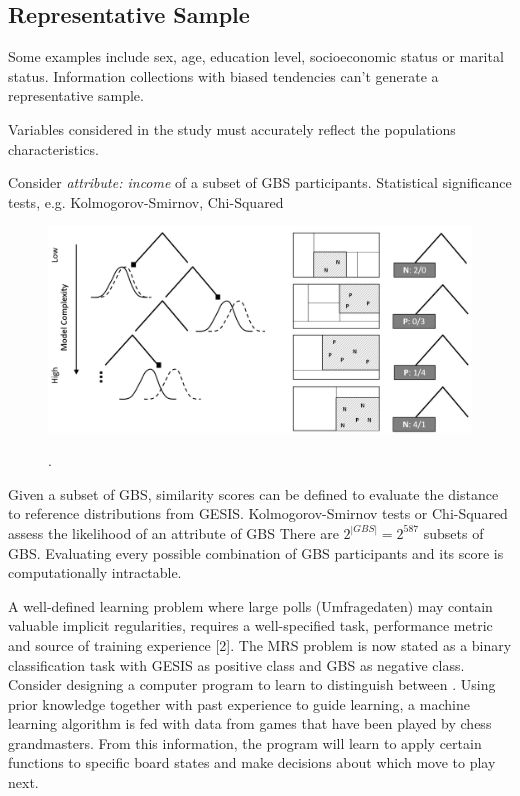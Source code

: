 \subsection{Representative Sample}

Some examples include sex, age, education level, socioeconomic status or marital status. Information collections with biased tendencies can't generate a representative sample.

Variables considered in the study must accurately reflect the populations characteristics. 

Consider \textit{attribute: income} of a subset of GBS participants. Statistical significance tests, e.g. Kolmogorov-Smirnov, Chi-Squared

\begin{figure}[ht]
	\begin{center}
		\includegraphics[scale=0.40,angle=0]{fig/tree3}
		\label{project}
		\caption{.}
	\end{center}
\end{figure}

Given a subset of GBS, similarity scores can be defined to evaluate the distance to reference distributions from GESIS. Kolmogorov-Smirnov tests or Chi-Squared assess the likelihood of an attribute of GBS  There are \(2^{|GBS|} = 2^{587}\) subsets of GBS. Evaluating every possible combination of GBS participants and its score is computationally intractable.

A well-deﬁned learning problem where large polls (Umfragedaten) may contain valuable implicit regularities, requires a well-speciﬁed task, performance metric and source of training experience [2]. The MRS problem is now stated as a binary classification task with GESIS as positive class and GBS as negative class. Consider designing a computer program to learn to distinguish between . Using prior knowledge together with past experience to guide learning, a machine learning algorithm
is fed with data from games that have been played by chess grandmasters. From this information, the program will learn to apply certain functions to speciﬁc board states and make decisions about which move to play next.

